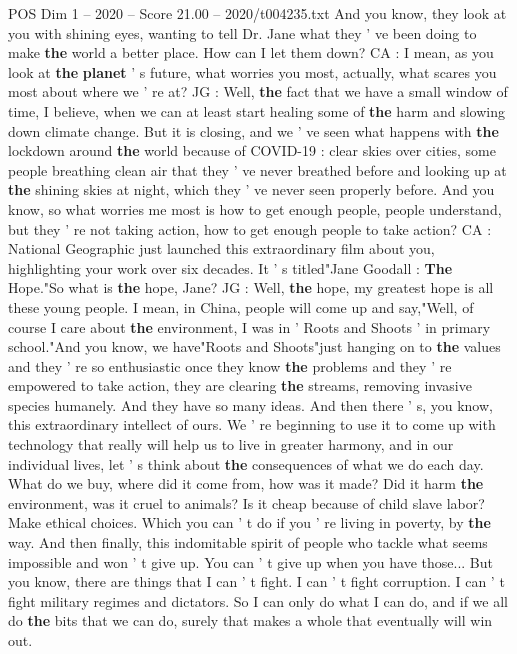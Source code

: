 \begin{textsample}{POS Dim 1 – 2020 – Score 21.00 – 2020/t004235.txt}
And you know, they look at you with shining eyes, wanting to tell Dr.
Jane what they ' ve been doing to make \textbf{the} world a better place.
How can I let them down?
CA : I mean, as you look at \textbf{the} \textbf{planet} ' s future, what worries you most, actually, what scares you most about where we ' re at?
JG : Well, \textbf{the} fact that we have a small window of time, I believe, when we can at least start healing some of \textbf{the} harm and slowing down climate change.
But it is closing, and we ' ve seen what happens with \textbf{the} lockdown around \textbf{the} world because of COVID-19 : clear skies over cities, some people breathing clean air that they ' ve never breathed before and looking up at \textbf{the} shining skies at night, which they ' ve never seen properly before.
And you know, so what worries me most is how to get enough people, people understand, but they ' re not taking action, how to get enough people to take action?
CA : National Geographic just launched this extraordinary film about you, highlighting your work over six decades.
It ' s titled"Jane Goodall : \textbf{The} Hope."So what is \textbf{the} hope, Jane?
JG : Well, \textbf{the} hope, my greatest hope is all these young people.
I mean, in China, people will come up and say,"Well, of course I care about \textbf{the} environment, I was in ' Roots and Shoots ' in primary school."And you know, we have"Roots and Shoots"just hanging on to \textbf{the} values and they ' re so enthusiastic once they know \textbf{the} problems and they ' re empowered to take action, they are clearing \textbf{the} streams, removing invasive species humanely.
And they have so many ideas.
And then there ' s, you know, this extraordinary intellect of ours.
We ' re beginning to use it to come up with technology that really will help us to live in greater harmony, and in our individual lives, let ' s think about \textbf{the} consequences of what we do each day.
What do we buy, where did it come from, how was it made?
Did it harm \textbf{the} environment, was it cruel to animals?
Is it cheap because of child slave labor?
Make ethical choices.
Which you can ' t do if you ' re living in poverty, by \textbf{the} way.
And then finally, this indomitable spirit of people who tackle what seems impossible and won ' t give up.
You can ' t give up when you have those...
But you know, there are things that I can ' t fight.
I can ' t fight corruption.
I can ' t fight military regimes and dictators.
So I can only do what I can do, and if we all do \textbf{the} bits that we can do, surely that makes a whole that eventually will win out.

\end{textsample}
